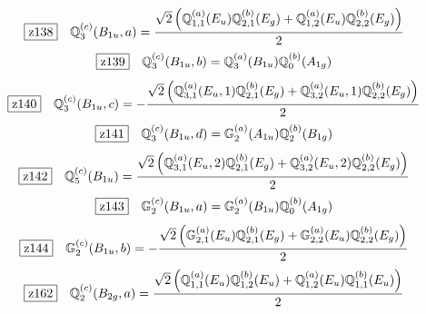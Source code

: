\documentclass[fleqn,10pt,landscape]{jsarticle}
\begin{document}
\begin{dmath*}
\hspace*{3mm}\fbox{z138}\quad \mathbb{Q}_{3}^{(c)}(B_{1u},a)=\frac{\sqrt{2} \left(\mathbb{Q}_{1,1}^{(a)}(E_{u}) \mathbb{Q}_{2,1}^{(b)}(E_{g}) + \mathbb{Q}_{1,2}^{(a)}(E_{u}) \mathbb{Q}_{2,2}^{(b)}(E_{g})\right)}{2}
\end{dmath*}
\begin{dmath*}
\hspace*{3mm}\fbox{z139}\quad \mathbb{Q}_{3}^{(c)}(B_{1u},b)=\mathbb{Q}_{3}^{(a)}(B_{1u}) \mathbb{Q}_{0}^{(b)}(A_{1g})
\end{dmath*}
\begin{dmath*}
\hspace*{3mm}\fbox{z140}\quad \mathbb{Q}_{3}^{(c)}(B_{1u},c)=- \frac{\sqrt{2} \left(\mathbb{Q}_{3,1}^{(a)}(E_{u},1) \mathbb{Q}_{2,1}^{(b)}(E_{g}) + \mathbb{Q}_{3,2}^{(a)}(E_{u},1) \mathbb{Q}_{2,2}^{(b)}(E_{g})\right)}{2}
\end{dmath*}
\begin{dmath*}
\hspace*{3mm}\fbox{z141}\quad \mathbb{Q}_{3}^{(c)}(B_{1u},d)=\mathbb{G}_{2}^{(a)}(A_{1u}) \mathbb{Q}_{2}^{(b)}(B_{1g})
\end{dmath*}
\begin{dmath*}
\hspace*{3mm}\fbox{z142}\quad \mathbb{Q}_{5}^{(c)}(B_{1u})=\frac{\sqrt{2} \left(\mathbb{Q}_{3,1}^{(a)}(E_{u},2) \mathbb{Q}_{2,1}^{(b)}(E_{g}) + \mathbb{Q}_{3,2}^{(a)}(E_{u},2) \mathbb{Q}_{2,2}^{(b)}(E_{g})\right)}{2}
\end{dmath*}
\begin{dmath*}
\hspace*{3mm}\fbox{z143}\quad \mathbb{G}_{2}^{(c)}(B_{1u},a)=\mathbb{G}_{2}^{(a)}(B_{1u}) \mathbb{Q}_{0}^{(b)}(A_{1g})
\end{dmath*}
\begin{dmath*}
\hspace*{3mm}\fbox{z144}\quad \mathbb{G}_{2}^{(c)}(B_{1u},b)=- \frac{\sqrt{2} \left(\mathbb{G}_{2,1}^{(a)}(E_{u}) \mathbb{Q}_{2,1}^{(b)}(E_{g}) + \mathbb{G}_{2,2}^{(a)}(E_{u}) \mathbb{Q}_{2,2}^{(b)}(E_{g})\right)}{2}
\end{dmath*}
\begin{dmath*}
\hspace*{3mm}\fbox{z162}\quad \mathbb{Q}_{2}^{(c)}(B_{2g},a)=\frac{\sqrt{2} \left(\mathbb{Q}_{1,1}^{(a)}(E_{u}) \mathbb{Q}_{1,2}^{(b)}(E_{u}) + \mathbb{Q}_{1,2}^{(a)}(E_{u}) \mathbb{Q}_{1,1}^{(b)}(E_{u})\right)}{2}
\end{dmath*}
\end{document}

